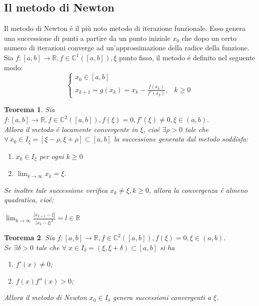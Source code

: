 \documentclass[12pt, letterpaper]{article}
\newtheorem{theorem}{Teorema}
\begin{document}
\subsection{Il metodo di Newton}
Il metodo di Newton \'e il più noto metodo di iterazione funzionale. Esso genera una successione di punti a partire da un punto iniziale
$x_0$ che dopo un certo numero di iterazioni converge ad un'approssimazione della radice della funzione. \\
Sia $f:[a,b] \to \mathbb{R}, f \in \mathbb{C}^1([a,b]), \xi$ punto fisso, il metodo \'e definito nel seguente modo:
\begin{equation}
\begin{cases}
    x_0 \in [a,b]\\
    x_{k+1} = g(x_k)=x_k-\frac{f(x_k)}{f'(x_k)},& k\geq0
\end{cases}
\end{equation}
\begin{theorem}
    Sia $f:[a,b] \to \mathbb{R}, f \in \mathbb{C}^2([a,b]), f(\xi)=0, f'(\xi)\neq 0, \xi \in (a,b).$\\
    Allora il metodo \'e locamente convergente in $\xi$, cio\'e $\exists \rho > 0$ tale che $\forall \, x_0 \in I_\xi=[\xi-\rho,\xi+\rho] \subset [a,b]$ la successione generata dal metodo soddisfa:
    \begin{enumerate}
        \item $x_k \in I_\xi$ per ogni $k\geq 0$
        \item $\lim_{k \to \infty} x_k=\xi.$
    \end{enumerate} 
    Se inoltre tale successione verifica $x_k \neq \xi, k \geq 0$, allora la convergenza \'e almeno quadratica, cio\'e:
    \begin{center}
        $\lim_{k \to \infty} \frac{|x_{k+1}-\xi|}{|x_k-\xi|^2}=l \in \mathbb{R}$
    \end{center}
\end{theorem}

\begin{theorem}
    Sia $f:[a,b] \to \mathbb{R}, f \in \mathbb{C}^2([a,b]), f(\xi)=0, \xi \in (a,b).$\\
    Se $\exists \delta>0$ tale che $\forall \; x \in I_\delta=(\xi,\xi + \delta) \subset [a,b]$ si ha
    \begin{enumerate}
        \item $f'(x) \neq 0$;
        \item $f(x)f''(x)>0$;
    \end{enumerate} 
    Allora il metodo di Newton $x_0 \in I_\delta$ genera successioni convergenti a $\xi$.
\end{theorem}
\end{document}
